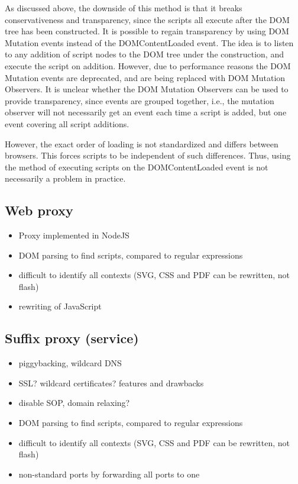 \documentclass{llncs}
\begin{document}
As discussed above, the downside of this method is that it breaks
conservativeness and transparency, since the scripts all execute after the DOM
tree has been constructed. It is possible to regain transparency by using DOM
Mutation events instead of the DOMContentLoaded event.  The idea is to listen
to any addition of script nodes to the DOM tree under the construction, and
execute the script on addition.  However, due to performance reasons the DOM
Mutation events are deprecated, and are being replaced with DOM Mutation
Observers. It is unclear whether the DOM Mutation Observers can be used to
provide transparency, since events are grouped together, i.e., the mutation
observer will not necessarily get an event each time a script is added, but one
event covering all script additions.

However, the exact order of loading is not standardized and differs between
browsers. This forces scripts to be independent of such differences. Thus,
using the method of executing scripts on the DOMContentLoaded event is not
necessarily a problem in practice. 


\subsection{Web proxy}

\begin{itemize}
\item Proxy implemented in NodeJS
\item DOM parsing to find scripts, compared to regular expressions
\item difficult to identify all contexts (SVG, CSS and PDF can be rewritten, not flash)
\item rewriting of JavaScript
\end{itemize}



\subsection{Suffix proxy (service)}

\begin{itemize}
\item piggybacking, wildcard DNS
\item SSL? wildcard certificates? features and drawbacks 
\item disable SOP, domain relaxing?
\item DOM parsing to find scripts, compared to regular expressions
\item difficult to identify all contexts (SVG, CSS and PDF can be rewritten, not flash)
\item non-standard ports by forwarding all ports to one
\end{itemize}
\end{document}
